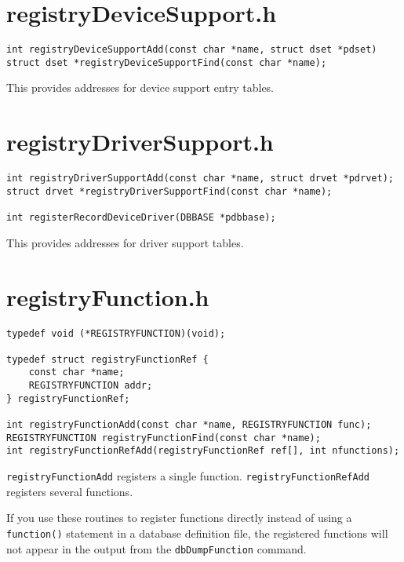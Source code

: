 \section{registryDeviceSupport.h}

\begin{verbatim}int registryDeviceSupportAdd(const char *name, struct dset *pdset)
struct dset *registryDeviceSupportFind(const char *name);
\end{verbatim}
This provides addresses for device support entry tables.

\section{registryDriverSupport.h}

\begin{verbatim}int registryDriverSupportAdd(const char *name, struct drvet *pdrvet);
struct drvet *registryDriverSupportFind(const char *name);

int registerRecordDeviceDriver(DBBASE *pdbbase);
\end{verbatim}
This provides addresses for driver support tables.

\section{registryFunction.h}

\begin{verbatim}typedef void (*REGISTRYFUNCTION)(void);

typedef struct registryFunctionRef {
    const char *name;
    REGISTRYFUNCTION addr;
} registryFunctionRef;

int registryFunctionAdd(const char *name, REGISTRYFUNCTION func);
REGISTRYFUNCTION registryFunctionFind(const char *name);
int registryFunctionRefAdd(registryFunctionRef ref[], int nfunctions);
\end{verbatim}
\verb|registryFunctionAdd| registers a single function. \verb|registryFunctionRefAdd| registers several functions.

If you use these routines to register functions directly instead of using a \verb|function()| statement in a database definition 
file, the registered functions will not appear in the output from the \verb|dbDumpFunction| command.

